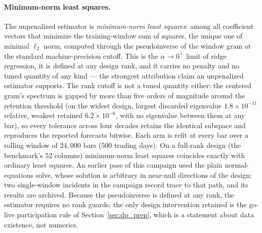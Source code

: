 \paragraph{Minimum-norm least squares.} The unpenalized estimator is
\emph{minimum-norm least squares}: among all coefficient vectors that
minimize the training-window sum of squares, the unique one of minimal
$\ell_2$ norm, computed through the pseudoinverse of the window gram at
the standard machine-precision cutoff. This is the $\alpha \to 0^{+}$
limit of ridge regression, it is defined at any design rank, and it
carries no penalty and no tuned quantity of any kind --- the strongest
attribution claim an unpenalized estimator supports. The rank cutoff is
not a tuned quantity either: the centered gram's spectrum is gapped by
more than five orders of magnitude around the retention threshold (on
the widest design, largest discarded eigenvalue $1.8 \times 10^{-11}$
relative, weakest retained $6.2 \times 10^{-6}$, with no eigenvalue
between them at any bar), so every tolerance across four decades retains
the identical subspace and reproduces the reported forecasts bitwise. Each arm is refit at
every bar over a rolling window of $24{,}000$ bars ($500$ trading days).
On a full-rank design (the benchmark's $52$ columns) minimum-norm least
squares coincides exactly with ordinary least squares. An earlier pass of
this campaign used the plain normal-equations solve, whose solution is
arbitrary in near-null directions of the design; two single-window
incidents in the campaign record trace to that path, and
its results are archived. Because the pseudoinverse is defined at any
rank, the estimator requires no rank guards; the only design
intervention retained is the go-live participation rule of
Section~\ref{sec:dp_prep}, which is a statement about data existence,
not numerics.

